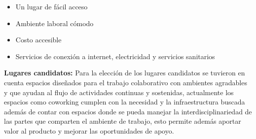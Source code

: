 \begin{itemize}
    \item Un lugar de fácil acceso
    \item Ambiente laboral cómodo
    \item Costo accesible
    \item Servicios de conexión a internet, electricidad y servicios sanitarios
\end{itemize}

\textbf{Lugares candidatos: } Para la elección de los lugares candidatos se tuvieron en cuenta espacios diseñados para el trabajo colaborativo con ambientes agradables y que ayudan al flujo de actividades continuas y sostenidas, actualmente los espacios como coworking cumplen con la necesidad y la infraestructura buscada además de contar con espacios donde se pueda manejar la interdisciplinariedad de las partes que comparten el ambiente de trabajo, esto permite además aportar valor al producto y mejorar las oportunidades de apoyo.

